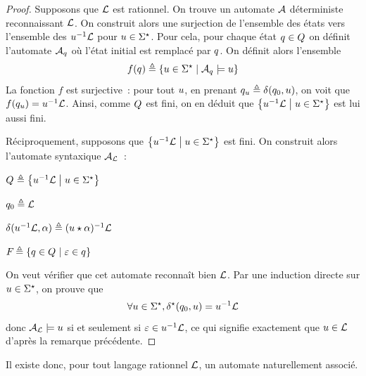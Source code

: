 \begin{proof}
  Supposons que $\mathcal L$ est rationnel. On trouve un automate $\mathcal{A}$
  déterministe reconnaissant $\mathcal L$. On construit alors une surjection de
  l'ensemble des états vers l'ensemble des $u^{-1}\mathcal L$ pour $u\in \Sigma^{\star}$. Pour
  cela, pour chaque état $q_{} \in Q_{}$ on définit l'automate
  $\mathcal{A}_{q_{}}$ où l'état initial est remplacé par $q_{}$. On définit alors
  l'ensemble
  \[f(q_{}) \triangleq \left\{ u\in\Sigma^{\star} \;\middle\vert\; \mathcal{A}_{q_{}} \models u \right\}\]
  La fonction $f$ est surjective~: pour tout $u$, en prenant
  $q_{u} \triangleq \delta_{}(q_{0},u)$, on voit que
  $f(q_{u}) = u^{-1}\mathcal L$. Ainsi, comme $Q_{}$ est fini, on en déduit que
  $\left\{ u^{-1}\mathcal L \;\middle\vert\; u\in\Sigma^{\star} \right\}$ est lui aussi fini.

  Réciproquement, supposons que $\left\{ u^{-1}\mathcal L \;\middle\vert\; u\in\Sigma^{\star} \right\}$ est fini. On
  construit alors l'automate syntaxique $\mathcal{A}_{\mathcal L}$~:
  \begin{itemize}
    \begin{minipage}{0.45\textwidth}
    \item $Q_{} \triangleq \left\{ u^{-1}\mathcal L \;\middle\vert\; u\in\Sigma^{\star} \right\}$
    \item $q_{0} \triangleq \mathcal L$
    \end{minipage}
    \begin{minipage}{0.45\textwidth}
    \item $\delta_{}(u^{-1}\mathcal L,\alpha) \triangleq (u\mathbin{\star}\alpha)^{-1}\mathcal L$
    \item $F_{} \triangleq \left\{ q_{} \in Q_{} \;\middle\vert\; \varepsilon \in q_{} \right\}$
    \end{minipage}
  \end{itemize}
  On veut vérifier que cet automate reconnaît bien $\mathcal L$. Par une induction
  directe sur $u\in\Sigma^{\star}$, on prouve que
  \[\forall u \in \Sigma^{\star}, \delta_{}^{\star}(q_{0},u) = u^{-1}\mathcal L\]
  donc $\mathcal{A}_{\mathcal L} \models u$ si et seulement si $\varepsilon \in u^{-1}\mathcal L$, ce
  qui signifie exactement que $u\in\mathcal L$ d'après la remarque précédente.
\end{proof}

Il existe donc, pour tout langage rationnel $\mathcal L$, un automate naturellement
associé.

